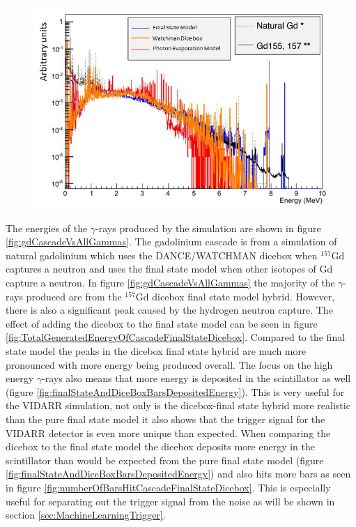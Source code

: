 \begin{figure}[!h]
 \centering
 \includegraphics[width=0.7\linewidth]{Chapter4/Figs/Raster/gadolinium/comparisonAndDiceBoxGd.png}
 \label{fig:comparisonAndDiceBoxGd}
\end{figure}

The energies of the $\gamma$-rays produced by the simulation are shown in figure \ref{fig:gdCascadeVsAllGammas}. The gadolinium cascade is from a simulation of natural gadolinium which uses the DANCE/WATCHMAN dicebox when $^{157}$Gd captures a neutron and uses the final state model when other isotopes of Gd capture a neutron. In figure \ref{fig:gdCascadeVsAllGammas} the majority of the $\gamma$-rays produced are from the $^{157}$Gd dicebox final state model hybrid. However, there is also a significant peak caused by the hydrogen neutron capture. The effect of adding the dicebox to the final state model can be seen in figure \ref{fig:TotalGeneratedEnergyOfCascadeFinalStateDicebox}. Compared to the final state model the peaks in the dicebox final state hybrid are much more pronounced with more energy being produced overall. The focus on the high energy $\gamma$-rays also means that more energy is deposited in the scintillator as well (figure \ref{fig:finalStateAndDiceBoxBarsDepositedEnergy}). This is very useful for the VIDARR simulation, not only is the dicebox-final state hybrid more realistic than the pure final state model it also shows that the trigger signal for the VIDARR detector is even more unique than expected. When comparing the dicebox to the final state model the dicebox deposits more energy in the scintillator than would be expected from the pure final state model (figure \ref{fig:finalStateAndDiceBoxBarsDepositedEnergy}) and also hits more bars as seen in figure \ref{fig:numberOfBarsHitCascadeFinalStateDicebox}. This is especially useful for separating out the trigger signal from the noise as will be shown in section \ref{sec:MachineLearningTrigger}.

